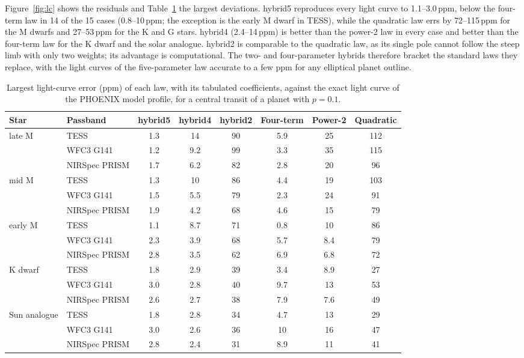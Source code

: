 \documentclass{aa}
\newcommand{\ppm}{\,\textrm{ppm}}
\begin{document}
Figure~\ref{fig:lc} shows the residuals and Table~\ref{tab:lc} the largest
deviations. hybrid5 reproduces every light curve to 1.1--3.0\ppm, below the
four-term law in 14 of the 15 cases (0.8--10\ppm; the exception is the early M dwarf in TESS), while the quadratic law errs
by 72--115\ppm{} for the M dwarfs and 27--53\ppm{} for the K and G stars. hybrid4
(2.4--14\ppm) is better than the power-2 law in every case and better than the
four-term law for the K dwarf and the solar analogue. hybrid2 is comparable to the
quadratic law, as its single pole cannot follow the steep limb with only two
weights; its advantage is computational. The two- and four-parameter hybrids
therefore bracket the standard laws they replace, with the light curves of the
five-parameter law accurate to a few ppm for any elliptical planet outline.

\begin{table}
\caption{Largest light-curve error (ppm) of each law, with its tabulated
coefficients, against the exact light curve of the PHOENIX model profile, for a
central transit of a planet with $p=0.1$.}
\label{tab:lc}
\centering
\begin{tabular}{llcccccc}
\hline\hline
Star & Passband & hybrid5 & hybrid4 & hybrid2 & Four-term & Power-2 & Quadratic\\
\hline
late M & TESS & 1.3 & 14 & 90 & 5.9 & 25 & 112\\
 & WFC3 G141 & 1.2 & 9.2 & 99 & 3.3 & 35 & 115\\
 & NIRSpec PRISM & 1.7 & 6.2 & 82 & 2.8 & 20 & 96\\
mid M & TESS & 1.3 & 10 & 86 & 4.4 & 19 & 103\\
 & WFC3 G141 & 1.5 & 5.5 & 79 & 2.3 & 24 & 91\\
 & NIRSpec PRISM & 1.9 & 4.2 & 68 & 4.6 & 15 & 79\\
early M & TESS & 1.1 & 8.7 & 71 & 0.8 & 10 & 86\\
 & WFC3 G141 & 2.3 & 3.9 & 68 & 5.7 & 8.4 & 79\\
 & NIRSpec PRISM & 2.8 & 3.5 & 62 & 6.9 & 6.8 & 72\\
K dwarf & TESS & 1.8 & 2.9 & 39 & 3.4 & 8.9 & 27\\
 & WFC3 G141 & 3.0 & 2.8 & 40 & 9.7 & 13 & 53\\
 & NIRSpec PRISM & 2.6 & 2.7 & 38 & 7.9 & 7.6 & 49\\
Sun analogue & TESS & 1.8 & 2.8 & 34 & 4.7 & 13 & 29\\
 & WFC3 G141 & 3.0 & 2.6 & 36 & 10 & 16 & 47\\
 & NIRSpec PRISM & 2.8 & 2.4 & 31 & 8.9 & 11 & 41\\
\hline
\end{tabular}
\end{table}
\end{document}
